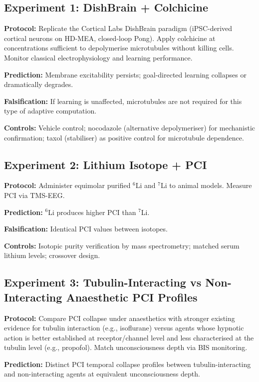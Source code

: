 \documentclass[10pt, a4paper, twocolumn]{article}
\begin{document}
\subsection{Experiment 1: DishBrain + Colchicine}

\textbf{Protocol:} Replicate the Cortical Labs DishBrain paradigm
(iPSC-derived cortical neurons on HD-MEA, closed-loop Pong). Apply
colchicine at concentrations sufficient to depolymerise microtubules
without killing cells. Monitor classical electrophysiology and learning
performance.

\textbf{Prediction:} Membrane excitability persists; goal-directed
learning collapses or dramatically degrades.

\textbf{Falsification:} If learning is unaffected, microtubules are not
required for this type of adaptive computation.

\textbf{Controls:} Vehicle control; nocodazole (alternative
depolymeriser) for mechanistic confirmation; taxol (stabiliser) as
positive control for microtubule dependence.

\subsection{Experiment 2: Lithium Isotope + PCI}

\textbf{Protocol:} Administer equimolar purified $^6$Li and $^7$Li to
animal models. Measure PCI via TMS-EEG.

\textbf{Prediction:} $^6$Li produces higher PCI than $^7$Li.

\textbf{Falsification:} Identical PCI values between isotopes.

\textbf{Controls:} Isotopic purity verification by mass spectrometry;
matched serum lithium levels; crossover design.

\subsection{Experiment 3: Tubulin-Interacting vs Non-Interacting
Anaesthetic PCI Profiles}

\textbf{Protocol:} Compare PCI collapse under anaesthetics with stronger
existing evidence for tubulin interaction (e.g., isoflurane) versus
agents whose hypnotic action is better established at receptor/channel
level and less characterised at the tubulin level (e.g., propofol).
Match unconsciousness depth via BIS monitoring.

\textbf{Prediction:} Distinct PCI temporal collapse profiles between
tubulin-interacting and non-interacting agents at equivalent
unconsciousness depth.
\end{document}
